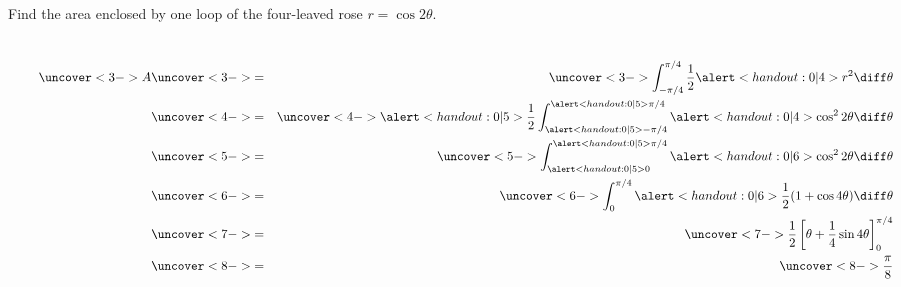 \begin{frame}
\begin{example}[Example 1, p. 686]
Find the area enclosed by one loop of the four-leaved rose \alert<handout:0| 4>{$r = \cos 2\theta$}.
\begin{columns}[c]
\ %

%
\begin{eqnarray*}
\uncover<3->{%
A%
}%
& \uncover<3->{ = } &%
\uncover<3->{%
\int_{-\pi /4}^{\pi /4}\frac{1}{2}\alert<handout:0| 4>{r^2}\diff \theta%
}\\%
& \uncover<4->{ = } &%
\uncover<4->{%
\alert<handout:0| 5>{\frac{1}{2}} \int_{\alert<handout:0| 5>{-\pi /4}}^{\alert<handout:0| 5>{\pi /4}}\alert<handout:0| 4>{\cos^22\theta} \diff \theta%
}\\%
& \uncover<5->{ = } &%
\uncover<5->{%
\int_{\alert<handout:0| 5>{0}}^{\alert<handout:0| 5>{\pi /4}}\alert<handout:0| 6>{\cos^22\theta} \diff \theta%
}\\%
& \uncover<6->{ = } &%
\uncover<6->{%
\int_{0}^{\pi /4}\alert<handout:0| 6>{\frac{1}{2}(1+\cos 4\theta )}\diff \theta%
}\\%
& \uncover<7->{ = } &%
\uncover<7->{%
\frac{1}{2}\left[ \theta + \frac{1}{4}\sin 4\theta\right]_0^{\pi /4}%
}\\%
& \uncover<8->{ = } &%
\uncover<8->{%
\frac{\pi}{8}%
}%
\end{eqnarray*}
\end{columns}
\end{example}
\end{frame}
